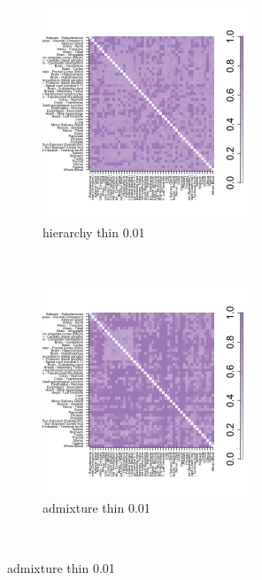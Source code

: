 \begin{figure}[ht]
     \begin{subfigure}[t]{0.5\textwidth}
        \centering
        \includegraphics[height=2.5in]{../plots/hierarchy_F_thin_0_01.png}
        \caption{hierarchy thin 0.01}
    \end{subfigure}%
    ~
    \begin{subfigure}[t]{0.5\textwidth}
        \centering
        \includegraphics[height=2.5in]{../plots/admixture_F_thin_0_01.png}
        \caption{admixture thin 0.01}
    \end{subfigure}\\
    

\end{figure}

